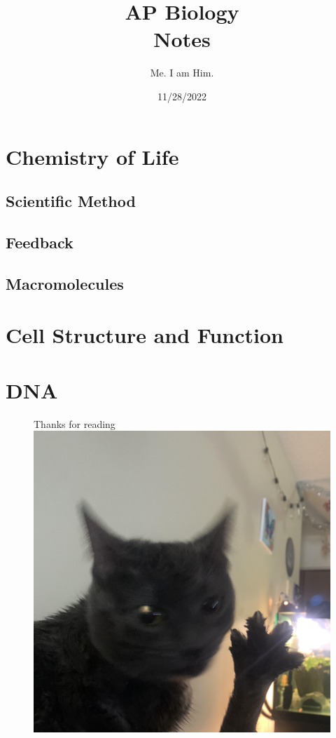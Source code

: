 \documentclass{report}
\title{\Huge{AP Biology}\\ Notes}
\author{Me. I am Him.}
\date{11/28/2022}
\begin{document}
\maketitle
\newpage
{}
\tableofcontents
\pagebreak

\thispagestyle{empty}
\newpage
\listoffigures
\clearpage
{}


\chapter{Chemistry of Life}
\section{Scientific Method}
\section{Feedback}
\section{Macromolecules}


\newpage
\chapter{Cell Structure and Function}\label{ch:cell-structure-and-function}



\chapter{DNA}\label{ch:dna}



\newpage
\begin{figure}
	\centering
	\Huge{Thanks for reading}
	\includegraphics[scale=0.2]{dabloon}
	\label{fig:dabloonia}
\end{figure}
\end{document}
